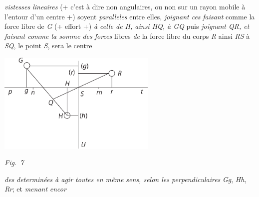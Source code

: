 %
\textit{vistesses lineaires} 
%
(+ c'est à dire non angulaires, ou non sur un rayon mobile à l'entour d'un centre +) 
%
soyent \textit{paralleles} entre elles, \textit{joignant ces}
%
%
\textit{faisant} comme la force libre de \textit{G} (+ effort +) 
%
\textit{à celle de \textit{H}, ainsi \textit{HQ}, à \textit{GQ}} puis \textit{joignant \textit{QR}, 
%
et faisant comme la somme des forces} libres \textit{de}
%
%
la force libre du corps \textit{R} ainsi \textit{RS} à \textit{SQ}, le point \textit{S}, sera le centre 
\pend
\newpage
\centerline{\includegraphics[width=0.57\textwidth]{gesamttex/edit_VIII,3/images/LH_38_212-215_d7_214r.pdf}}
\vspace{0.5em}
\centerline{\lbrack\textit{Fig.~7}\rbrack}
\vspace{1.5em}
%
\pstart
\noindent \textit{des} 
%
%
\textit{determinées à agir toutes en même sens, selon les perpendiculaires} 
%
\textit{Gg}, \textit{Hh}, \textit{Rr}; et \textit{menant} \textit{encor}
